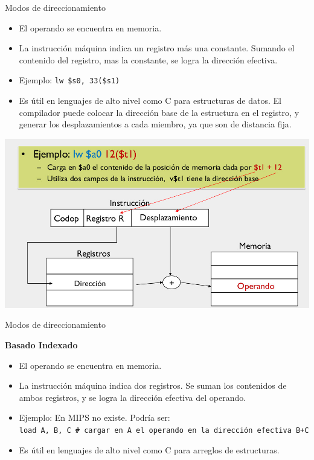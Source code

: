 \documentclass[aspectratio=169,compress]{beamer}
\begin{document}
\begin{footnotesize}
\begin{frame}{Modos de direccionamiento}
\begin{itemize}
\item El operando se encuentra en memoria.
\item La instrucción máquina indica un registro más una constante. Sumando el contenido del registro, mas la constante, se logra la dirección efectiva.
\item Ejemplo: \texttt{lw \$s0, 33(\$s1)}
\item Es útil en lenguajes de alto nivel como C para estructuras de datos. El compilador puede colocar la dirección base de la estructura en el registro, y generar los desplazamientos a cada miembro, ya que son de distancia fija.

\end{itemize}

	\begin{center}
\includegraphics[scale=0.18]{images/dir-base-desplazamiento.jpg} 
	\end{center}
\end{frame}


\begin{frame}{Modos de direccionamiento}
\begin{center}\textbf{Basado Indexado}\end{center}

\begin{itemize}
\item El operando se encuentra en memoria.
\item La instrucción máquina indica dos registros. Se suman los contenidos de ambos registros, y se logra la dirección efectiva del operando.
\item Ejemplo: En MIPS no existe. Podría ser: \\ \texttt{load  A, B, C  \# cargar en A el operando en la dirección efectiva B+C}
\item Es útil en lenguajes de alto nivel como C para arreglos de estructuras.


\end{itemize}
\end{frame}
\end{footnotesize}
\end{document}
